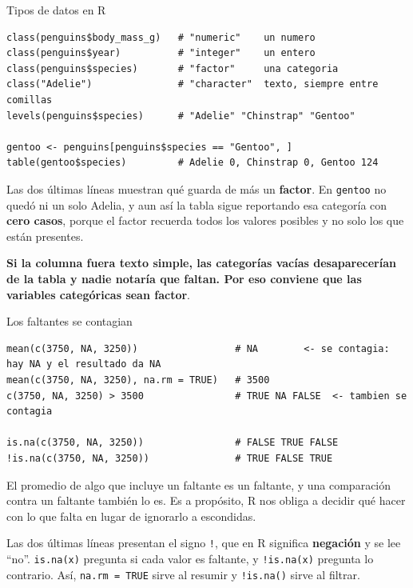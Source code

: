 \documentclass[aspectratio=169,10pt]{beamer}
\newcommand{\Rc}[1]{{\setlength{\fboxsep}{1.6pt}%
  \colorbox{codigoFondo}{\textcolor{codigoTexto}{\texttt{#1}}}}}
\newcommand{\destaca}[1]{%
  \par\vspace{3pt}\noindent
  \colorbox{azulClaro}{%
    \parbox{\dimexpr\linewidth-2\fboxsep\relax}{\vspace{3pt}#1\vspace{3pt}}}%
  \par\vspace{3pt}}
\begin{document}
\begin{frame}[fragile]{Tipos de datos en R}
\begin{lstlisting}
class(penguins$body_mass_g)   # "numeric"    un numero
class(penguins$year)          # "integer"    un entero
class(penguins$species)       # "factor"     una categoria
class("Adelie")               # "character"  texto, siempre entre comillas
levels(penguins$species)      # "Adelie" "Chinstrap" "Gentoo"

gentoo <- penguins[penguins$species == "Gentoo", ]
table(gentoo$species)         # Adelie 0, Chinstrap 0, Gentoo 124
\end{lstlisting}

  \vspace{0.25cm}
  \destaca{\small Las dos últimas líneas muestran qué guarda de más un \textbf{factor}.
  En \texttt{gentoo} no quedó ni un solo Adelia, y aun así la tabla sigue reportando esa
  categoría con \textbf{cero casos}, porque el factor recuerda todos los valores
  posibles y no solo los que están presentes.

  \vspace{0.15cm}
  \textbf{Si la columna fuera texto simple, las categorías vacías desaparecerían de la tabla y
  nadie notaría que faltan. Por eso conviene que las variables categóricas sean factor}.}
\end{frame}
\begin{frame}[fragile]{Los faltantes se contagian}
\begin{lstlisting}
mean(c(3750, NA, 3250))                 # NA        <- se contagia: hay NA y el resultado da NA
mean(c(3750, NA, 3250), na.rm = TRUE)   # 3500
c(3750, NA, 3250) > 3500                # TRUE NA FALSE  <- tambien se contagia

is.na(c(3750, NA, 3250))                # FALSE TRUE FALSE
!is.na(c(3750, NA, 3250))               # TRUE FALSE TRUE
\end{lstlisting}

  \vspace{0.25cm}
  \destaca{\small El promedio de algo que incluye un faltante es un faltante, y una
  comparación contra un faltante también lo es. Es a propósito, R nos obliga a decidir
  qué hacer con lo que falta en lugar de ignorarlo a escondidas.

  \vspace{0.15cm}
  Las dos últimas líneas presentan el signo \Rc{!}, que en R significa \textbf{negación}
  y se lee ``no''. \Rc{is.na(x)} pregunta si cada valor es faltante, y \Rc{!is.na(x)}
  pregunta lo contrario. Así, \Rc{na.rm = TRUE} sirve al resumir y \Rc{!is.na()} sirve
  al filtrar.}
\end{frame}
\end{document}
